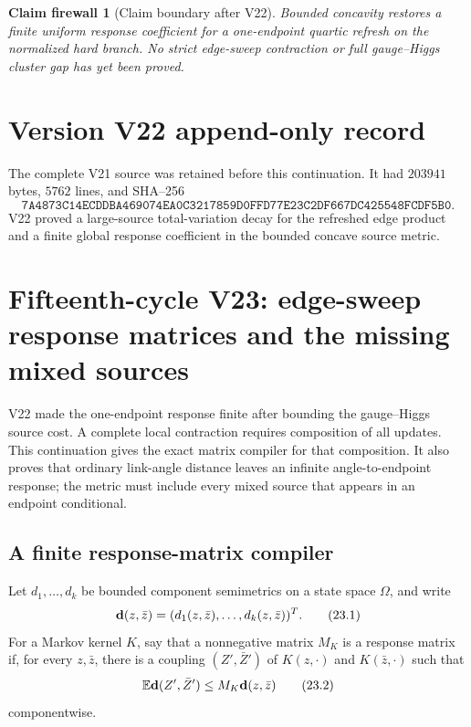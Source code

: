 \documentclass[11pt]{article}
\newtheorem{firewall}[theorem]{Claim firewall}
\theoremstyle{remark}
\begin{document}
\begin{firewall}[Claim boundary after V22]
\label{fire:v15v22}
Bounded concavity restores a finite uniform response coefficient
for a one-endpoint quartic refresh on the normalized hard branch.
No strict edge-sweep contraction or full gauge--Higgs cluster gap
has yet been proved.
\end{firewall}

\section*{Version V22 append-only record}
The complete V21 source was retained before this continuation.  It
had \(203941\) bytes, \(5762\) lines, and SHA--256
\[
 \texttt{7A4873C14ECDDBA469074EA0C3217859D0FFD77E23C2DF667DC425548FCDF5B0}.
\]
V22 proved a large-source total-variation decay for the refreshed
edge product and a finite global response coefficient in the
bounded concave source metric.
\section{Fifteenth-cycle V23: edge-sweep response matrices and the missing mixed sources}
\label{sec:v15v23}

V22 made the one-endpoint response finite after bounding the
gauge--Higgs source cost.  A complete local contraction requires
composition of all updates.  This continuation gives the exact
matrix compiler for that composition.  It also proves that ordinary
link-angle distance leaves an infinite angle-to-endpoint response;
the metric must include every mixed source that appears in an
endpoint conditional.

\subsection{A finite response-matrix compiler}

Let \(d_1,\ldots,d_k\) be bounded component semimetrics on a state
space \(\Omega\), and write
\[
 {\bf d}(z,\bar z)
 =
 (d_1(z,\bar z),\ldots,d_k(z,\bar z))^T.                   \tag{23.1}
\]
For a Markov kernel \(K\), say that a nonnegative matrix \(M_K\)
is a response matrix if, for every \(z,\bar z\), there is a coupling
\((Z',\bar Z')\) of \(K(z,\cdot)\) and \(K(\bar z,\cdot)\) such
that
\[
 \mathbb E{\bf d}(Z',\bar Z')
 \le M_K{\bf d}(z,\bar z)                                  \tag{23.2}
\]
componentwise.
\end{document}
